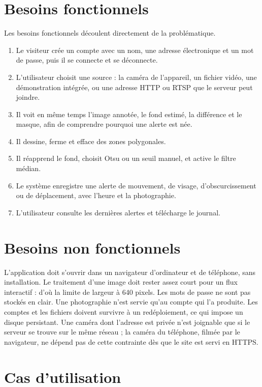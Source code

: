 \section{Besoins fonctionnels}

Les besoins fonctionnels découlent directement de la problématique.

\begin{enumerate}
  \item Le visiteur crée un compte avec un nom, une adresse électronique et un mot de passe, puis il se connecte et se déconnecte.
  \item L'utilisateur choisit une source : la caméra de l'appareil, un fichier vidéo, une démonstration intégrée, ou une adresse HTTP ou RTSP que le serveur peut joindre.
  \item Il voit en même temps l'image annotée, le fond estimé, la différence et le masque, afin de comprendre pourquoi une alerte est née.
  \item Il dessine, ferme et efface des zones polygonales.
  \item Il réapprend le fond, choisit Otsu ou un seuil manuel, et active le filtre médian.
  \item Le système enregistre une alerte de mouvement, de visage, d'obscurcissement ou de déplacement, avec l'heure et la photographie.
  \item L'utilisateur consulte les dernières alertes et télécharge le journal.
\end{enumerate}

\section{Besoins non fonctionnels}

L'application doit s'ouvrir dans un navigateur d'ordinateur et de téléphone, sans installation. Le traitement d'une image doit rester assez court pour un flux interactif : d'où la limite de largeur à 640 pixels. Les mots de passe ne sont pas stockés en clair. Une photographie n'est servie qu'au compte qui l'a produite. Les comptes et les fichiers doivent survivre à un redéploiement, ce qui impose un disque persistant. Une caméra dont l'adresse est privée n'est joignable que si le serveur se trouve sur le même réseau ; la caméra du téléphone, filmée par le navigateur, ne dépend pas de cette contrainte dès que le site est servi en HTTPS.

\section{Cas d'utilisation}

